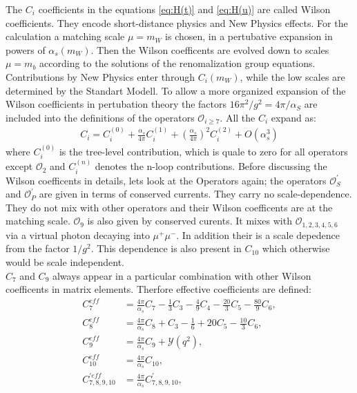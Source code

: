 \documentclass[english]{uzhpub}
\begin{document}
The $C_i$ coefficients in the equations \ref{eq:H(t)} and \ref{eq:H(u)} are called Wilson coefficients. They encode short-distance physics and New Physics effects. For the calculation a matching scale $\mu = m_W$ is chosen, in a pertubative expansion in powers of $\alpha_s (m_W)$. Then the Wilson coefficents are evolved down to scales $\mu = m_b$ according to the solutions of the renomalization group equations. Contributions by New Physics enter through $C_i(m_W)$, while the low scales are determined by the Standart Modell. To allow a more organized expansion of the Wilson coefficients in pertubation theory the factors $16 \pi^2 / g^2 = 4 \pi / \alpha_S$ are included into the definitions of the operators $\mathcal{O}_{i \geq 7}$. All the $C_i$ expand as:
\begin{align}
 C_i = C_i^{(0)} + \frac{\alpha_s}{4 \pi} C_i^{(1)} + \left( \frac{\alpha_s}{4 \pi} \right)^2 C_i^{(2)} + O(\alpha_s^3)
\end{align}
where $C_i^{(0)}$ is the tree-level contribution, which is quale to zero for all operators except $\mathcal{O}_2$ and $C_i^{(n)}$ denotes the n-loop contributions.
Before discussing the Wilson coefficents in details, lets look at the Operators again; the operators $\mathcal{O}_S^\prime$ and $\mathcal{O}_P^\prime$ are given in terms of conserved currents. They carry no scale-dependence. They do not mix with other operators and their Wilson coefficents are at the matching scale. $\mathcal{O}_9$ is also given by conserved curents. It mixes with $\mathcal{O}_{1,2,3,4,5,6}$ via a virtual photon decaying into $\mu^+ \mu^-$. In addition their is a scale depedence from the factor $1/g^2$. This dependence is also present in $C_{10}$ which otherwise would be scale independent. \\
$C_7$ and $C_9$ always appear in a particular combination with other Wilson coefficents in matrix elements. Therfore effective coefficients are defined:
\begin{equation}
 \begin{split}
  C_7^{eff} &= \frac{4 \pi}{\alpha_s} C_7 - \frac{1}{3} C_3 - \frac{4}{9} C_4 - \frac{20}{3} C_5 - \frac{80}{9} C_6, \\
  C_8^{eff} &= \frac{4 \pi}{\alpha_s} C_8 + C_3 - \frac{1}{6} + 20 C_5 - \frac{10}{3} C_6 , \\
  C_9^{eff} &= \frac{4\pi}{\alpha_s} C_9 + \mathcal{Y}(q^2), \\
  C_{10}^{eff} &= \frac{4 \pi}{\alpha_s} C_{10}, \\
  C_{7,8,9,10}^{\prime eff} &= \frac{4 \pi}{\alpha_s} C_{7,8,9,10}^{\prime},
 \end{split}
\end{equation}
\end{document}

